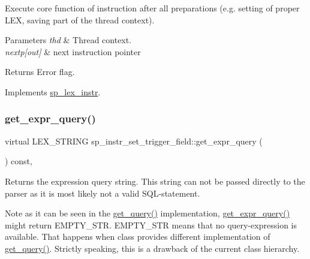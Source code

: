 Execute core function of instruction after all preparations (e.\+g. setting of proper L\+EX, saving part of the thread context).


\begin{DoxyParams}{Parameters}
{\em thd} & Thread context. \\
\hline
{\em nextp\mbox{[}out\mbox{]}} & next instruction pointer\\
\hline
\end{DoxyParams}
\begin{DoxyReturn}{Returns}
Error flag. 
\end{DoxyReturn}


Implements \mbox{\hyperlink{classsp__lex__instr_acab4e56f638f43101c11f838e1f9d395}{sp\+\_\+lex\+\_\+instr}}.

\mbox{\label{classsp__instr__set__trigger__field_ae10dfb93c95ef7b04ae13d4d8cc9c5fc}} 
\subsubsection{\texorpdfstring{get\+\_\+expr\+\_\+query()}{get\_expr\_query()}}
{\footnotesize\ttfamily virtual L\+E\+X\+\_\+\+S\+T\+R\+I\+NG sp\+\_\+instr\+\_\+set\+\_\+trigger\+\_\+field\+::get\+\_\+expr\+\_\+query (\begin{DoxyParamCaption}{ }\end{DoxyParamCaption}) const\hspace{0.3cm}{\ttfamily [inline]}, {\ttfamily [virtual]}}

\begin{DoxyReturn}{Returns}
the expression query string. This string can not be passed directly to the parser as it is most likely not a valid S\+QL-\/statement.
\end{DoxyReturn}
\begin{DoxyNote}{Note}
as it can be seen in the \mbox{\hyperlink{classsp__lex__instr_a8bbcccae8739634565f8be2134171b03}{get\+\_\+query()}} implementation, \mbox{\hyperlink{classsp__instr__set__trigger__field_ae10dfb93c95ef7b04ae13d4d8cc9c5fc}{get\+\_\+expr\+\_\+query()}} might return E\+M\+P\+T\+Y\+\_\+\+S\+TR. E\+M\+P\+T\+Y\+\_\+\+S\+TR means that no query-\/expression is available. That happens when class provides different implementation of \mbox{\hyperlink{classsp__lex__instr_a8bbcccae8739634565f8be2134171b03}{get\+\_\+query()}}. Strictly speaking, this is a drawback of the current class hierarchy. 
\end{DoxyNote}


